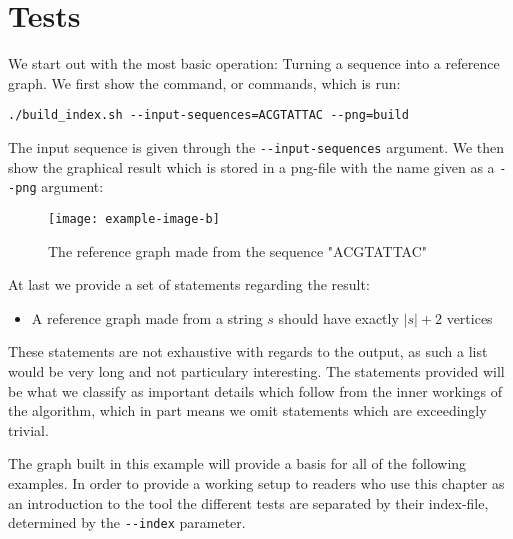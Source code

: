 \documentclass[thesis.tex]{subfiles}
\begin{document}
\section{Tests}
We start out with the most basic operation: Turning a sequence into a reference graph. We first show the command, or commands, which is run:\\
\par\noindent
\texttt{./build\_index.sh -{}-input-sequences=ACGTATTAC -{}-png=build}\\
\par\noindent
The input sequence is given through the \texttt{-{}-input-sequences} argument. We then show the graphical result which is stored in a png-file with the name given as a \texttt{-{}-png} argument:\\
\begin{figure}[!h]
  \texttt{[image: example-image-b]} 
  \caption{The reference graph made from the sequence "ACGTATTAC"}
  \label{fig:validation_ref}
\end{figure}
\par\noindent
At last we provide a set of statements regarding the result:
\begin{itemize}
  \item A reference graph made from a string $s$ should have exactly $|s|+2$ vertices
\end{itemize}
These statements are not exhaustive with regards to the output, as such a list would be very long and not particulary interesting. The statements provided will be what we classify as important details which follow from the inner workings of the algorithm, which in part means we omit statements which are exceedingly trivial.\\
\par\noindent
The graph built in this example will provide a basis for all of the following examples. In order to provide a working setup to readers who use this chapter as an introduction to the tool the different tests are separated by their index-file, determined by the \texttt{-{}-index} parameter.
\end{document}
